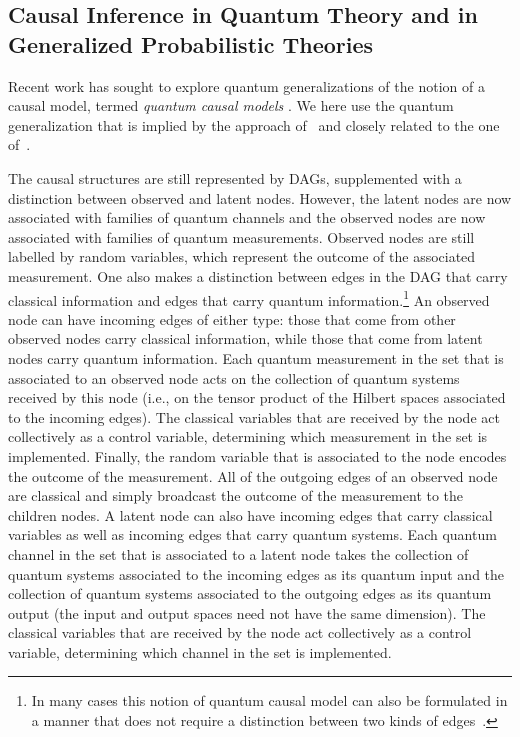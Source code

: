 \documentclass[aps,english,10pt,superscriptaddress,onecolumn,twoside,longbibliography,pra,floatfix,fleqn,nofootinbib]{revtex4-1}
\theoremstyle{definition}
\begin{document}
\subsection{Causal Inference in Quantum Theory and in Generalized Probabilistic Theories}
\label{sec:classicallity}

Recent work has sought to explore quantum generalizations of the notion of a causal model, termed {\em quantum causal models} \cite{leifer2013conditionalstates,pusey2014gdag,BeyondBellII,Chaves2015infoquantum,ried2015quantum,costa2016quantum,allen2016quantum}. 
We here use 
the quantum generalization that is implied by the approach of~\cite{pusey2014gdag} and closely related to the one of~\cite{BeyondBellII}.

The causal structures are still represented by DAGs, supplemented with a distinction between observed and latent nodes.  However, the latent nodes are now associated with families of quantum channels and the observed nodes are now associated with families of quantum  measurements.  Observed nodes are still labelled by random variables, which represent the outcome of the associated measurement. 
One also makes a distinction between edges in the DAG that carry classical information and edges that carry quantum information.\footnote{In many
cases this notion of quantum causal model can also be formulated in a manner that does not require a distinction between two kinds of edges~\cite{BeyondBellII}.} 
 An observed node can have incoming edges of either type: 
those that come from other observed nodes carry classical information, while those that come from latent nodes carry quantum information.  Each quantum measurement in the set that is associated to an observed node acts on the collection of quantum systems received by this node (i.e., on the tensor product of the Hilbert spaces associated to the incoming edges).  The classical variables that are received by the node act collectively as a control variable, determining which measurement in the set is implemented.  Finally, the random variable that is associated to the node encodes the outcome of the measurement.  All of the outgoing edges of an observed node are classical and simply broadcast the outcome of the measurement to the children nodes. 
A latent node can also have incoming edges that carry classical variables as well as incoming edges that carry quantum systems.   Each quantum channel in the set that is associated to a latent node takes the collection of quantum systems associated to the incoming edges as its quantum input and the collection of quantum systems associated to the outgoing edges as its quantum output (the input and output spaces need not have the same dimension).  The classical variables that are received by the node act collectively as a control variable, determining which channel in the set is implemented.
\end{document}
